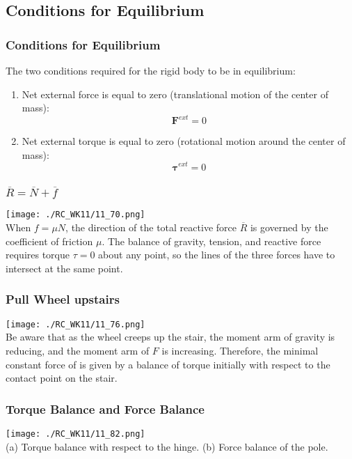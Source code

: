 \subsection{Conditions for Equilibrium}
\begin{frame}
\frametitle{Conditions for Equilibrium}
The two conditions required for the rigid body to be in equilibrium:
\begin{enumerate}
\item{Net external force is equal to zero (\alert{translational} motion of the center of mass):\[\mathbf{F}^{ext}=0\]}
\item{Net external torque is equal to zero (\alert{rotational} motion around the center of mass):\[\mathbf{\tau}^{ext}=0\]}
\end{enumerate}
\end{frame}
\begin{frame}
\frametitle{$\overline R=\overline N+\overline f$}
\begin{multicols}{2}
\texttt{[image: ./RC\_WK11/11\_70.png]}\\
When $f=\mu N$, the direction of the total reactive force $\overline R$ is governed by the coefficient of friction $\mu$. The balance of gravity, tension, and reactive force requires torque $\tau=0$ about any point, so the \alert{lines} of the three forces have to \alert{intersect at the same point}.
\end{multicols}
\end{frame}
\begin{frame}
\frametitle{Pull Wheel upstairs}
\begin{multicols}{2}
\texttt{[image: ./RC\_WK11/11\_76.png]}\\
Be aware that as the wheel creeps up the stair, the moment arm of gravity is reducing, and the moment arm of $F$ is increasing. Therefore, the \alert{minimal} constant force of is given by a \alert{balance of torque} initially with respect to the contact point on the stair.
\end{multicols}
\end{frame}
\begin{frame}
\frametitle{Torque Balance and Force Balance}
\begin{multicols}{2}
\texttt{[image: ./RC\_WK11/11\_82.png]}\\
(a) \alert{Torque} balance with respect to the hinge.
(b)	\alert{Force} balance of the pole.
\end{multicols}
\end{frame}
